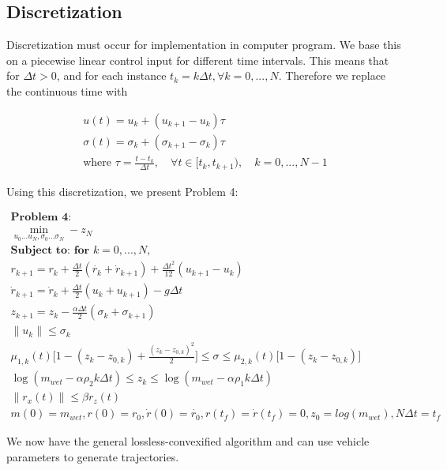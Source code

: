 \documentclass[journal]{new-aiaa}
\begin{document}
\begin{singlespace}
\section{Discretization}
Discretization must occur for implementation in computer program. We base this on a piecewise linear control input for different time intervals. This means that for $\Delta t > 0$, and for each instance $t_k = k\Delta t, \forall k = 0,...,N$. Therefore we replace the continuous time with

\begin{align}
u(t) = u_k + (u_{k+1} - u_k)\tau \\
\sigma(t) = \sigma_k + (\sigma_{k+1} - \sigma_k)\tau \\
\text{where } \tau = \frac{t - t_k}{ \Delta t}, \quad \forall t \in [t_k,t_{k+1}), \quad k = 0,...,N-1
\end{align}

Using this discretization, we present Problem 4:

\begin{align*}
 \textbf{Problem 4:} \\
 \min_{u_0 ... u_N, \sigma_0 ... \sigma_N} -z_N \\
 \textbf{Subject to: for } k = 0,...,N,\\
r_{k+1} = r_k + \frac{\Delta t}{2}(\dot{r_k} + \dot{r}_{k+1}) + \frac{\Delta t^2}{12}(u_{k+1}-u_k) \\
\dot{r}_{k+1} = \dot{r}_k + \frac{\Delta t}{2}(u_k + u_{k+1}) - g\Delta t \\
z_{k+1} = z_k - \frac{\alpha \Delta t}{2}(\sigma_k + \sigma_{k+1}) \\
\|u_k\| \leq \sigma_k \\ 
 \mu_{1,k}(t)\Big[ 1-(z_k-z_{0,k})+\frac{(z_k-z_{0,k})^2}{2} \Big] \leq \sigma \leq \mu_{2,k}(t)\big[ 1-(z_k-z_{0,k})\big] \\
 \log(m_{wet}-\alpha\rho_2k\Delta t) \leq z_k \leq \log(m_{wet}-\alpha\rho_1k\Delta t) \\
 \|r_x(t)\| \leq \beta r_z(t) \\
 m(0) = m_{wet}, r(0) = r_0, \dot{r}(0) = \dot{r_0}, r(t_f) =\dot{r}(t_f) = 0, z_0 = log(m_{wet}), N\Delta t = t_f
\end{align*}

We now have the general lossless-convexified algorithm and can use vehicle parameters to generate trajectories.


\end{singlespace}
\end{document}
